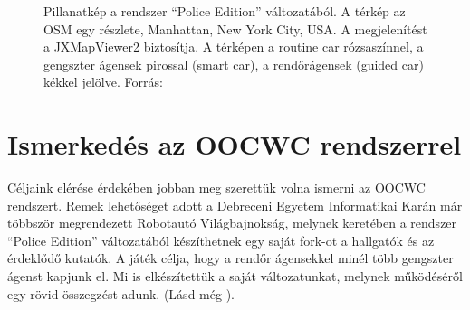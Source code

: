 \documentclass[a4paper,12pt]{report}
\begin{document}
\begin{figure}[h]
\centering
{}
\quad
{}
\caption{Pillanatkép a rendszer ``Police Edition'' változatából. A térkép az OSM egy részlete, Manhattan, New York City, USA. A megjelenítést a JXMapViewer2 \cite{jxmapv} biztosítja. A térképen a routine car rózsaszínnel, a gengszter ágensek pirossal (smart car), a rendőrágensek (guided car) kékkel jelölve. Forrás: \cite{infocomjournal} \label{police}}
\end{figure}

\section{Ismerkedés az OOCWC rendszerrel}

Céljaink elérése érdekében jobban meg szerettük volna ismerni az OOCWC rendszert. Remek lehetőséget adott a Debreceni Egyetem Informatikai Karán már többször megrendezett Robotautó Világbajnokság, melynek keretében a rendszer ``Police Edition'' változatából készíthetnek egy saját fork-ot a hallgatók és az érdeklődő kutatók. A játék célja, hogy a rendőr ágensekkel minél több gengszter ágenst kapjunk el. Mi is elkészítettük a saját változatunkat, melynek működéséről egy rövid összegzést adunk. (Lásd még \cite{forkcoginfocom}).
\end{document}
